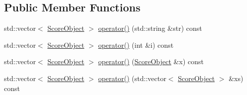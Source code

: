 \subsection*{Public Member Functions}
\begin{DoxyCompactItemize}
\item 
std\-::vector$<$ \hyperlink{class_score_object}{Score\-Object} $>$ \hyperlink{classget_vector_of_score_objects_arg_a7426c57dfb3402f2e9054c9ac85c0647}{operator()} (std\-::string \&str) const 
\item 
std\-::vector$<$ \hyperlink{class_score_object}{Score\-Object} $>$ \hyperlink{classget_vector_of_score_objects_arg_a222f7c2c38e8ba39faa299fb90d273dc}{operator()} (int \&i) const 
\item 
std\-::vector$<$ \hyperlink{class_score_object}{Score\-Object} $>$ \hyperlink{classget_vector_of_score_objects_arg_a1cea57cf980328cd3d8e36ca0ce953ba}{operator()} (\hyperlink{class_score_object}{Score\-Object} \&x) const 
\item 
std\-::vector$<$ \hyperlink{class_score_object}{Score\-Object} $>$ \hyperlink{classget_vector_of_score_objects_arg_acb057628f3de707e20414112135d2504}{operator()} (std\-::vector$<$ \hyperlink{class_score_object}{Score\-Object} $>$ \&xs) const 
\end{DoxyCompactItemize}


